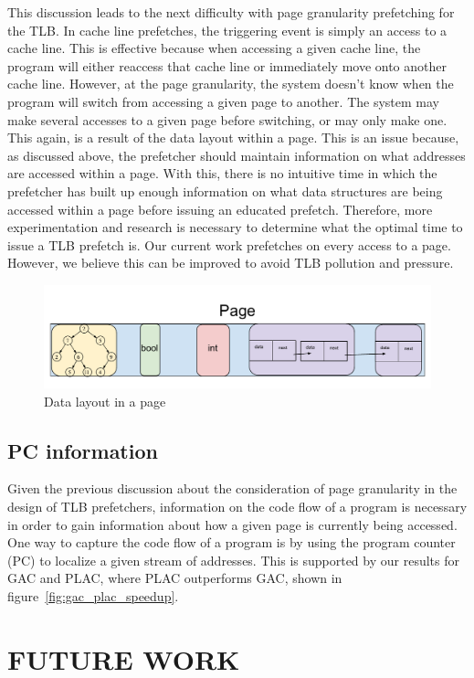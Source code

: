 \documentclass[conference]{IEEEtran}
\begin{document}
        This discussion leads to the next difficulty with page granularity prefetching for the TLB. In cache line prefetches, the triggering event is simply an access to a cache line. This is effective because when accessing a given cache line, the program will either reaccess that cache line or immediately move onto another cache line. However, at the page granularity, the system doesn’t know when the program will switch from accessing a given page to another. The system may make several accesses to a given page before switching, or may only make one. This again, is a result of the data layout within a page. This is an issue because, as discussed above, the prefetcher should maintain information on what addresses are accessed within a page. With this, there is no intuitive time in which the prefetcher has built up enough information on what data structures are being accessed within a page before issuing an educated prefetch. Therefore, more experimentation and research is necessary to determine what the optimal time to issue a TLB prefetch is. Our current work prefetches on every access to a page. However, we believe this can be improved to avoid TLB pollution and pressure.
            \begin{figure}[h]
            \vspace*{\floatsep}
            \centering
            \includegraphics[width=.5\textwidth]{Page_granularity_data_structures.pdf}
            \caption{Data layout in a page}
            \label{fig:page_ds}
            \end{figure}
    \subsection{PC information}
        Given the previous discussion about the consideration of page granularity in the design of TLB prefetchers, information on the code flow of a program is necessary in order to gain information about how a given page is currently being accessed. One way to capture the code flow of a program is by using the program counter (PC) to localize a given stream of addresses. This is supported by our results for GAC and PLAC, where PLAC outperforms GAC, shown in figure~\ref{fig:gac_plac_speedup}.  
\section{FUTURE WORK}
\end{document}
